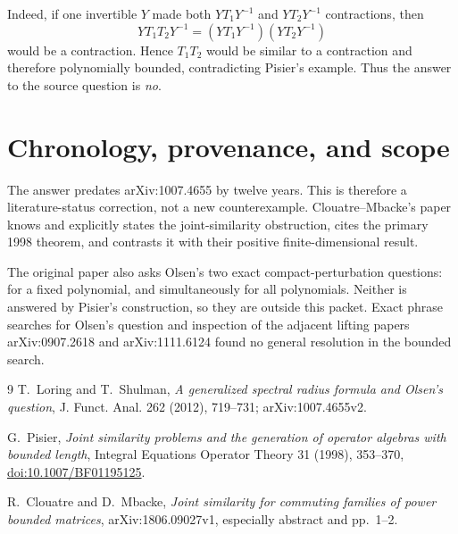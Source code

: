 \documentclass[10pt]{article}
\begin{document}
Indeed, if one invertible $Y$ made both $YT_1Y^{-1}$ and $YT_2Y^{-1}$
contractions, then
\[
 YT_1T_2Y^{-1}=(YT_1Y^{-1})(YT_2Y^{-1})
\]
would be a contraction.  Hence $T_1T_2$ would be similar to a contraction and
therefore polynomially bounded, contradicting Pisier's example.  Thus the
answer to the source question is \emph{no}.

\section*{Chronology, provenance, and scope}

The answer predates arXiv:1007.4655 by twelve years.  This is therefore a
literature-status correction, not a new counterexample.  Clouatre--Mbacke's
paper knows and explicitly states the joint-similarity obstruction, cites the
primary 1998 theorem, and contrasts it with their positive finite-dimensional
result.

The original paper also asks Olsen's two exact compact-perturbation questions:
for a fixed polynomial, and simultaneously for all polynomials.  Neither is
answered by Pisier's construction, so they are outside this packet.  Exact
phrase searches for Olsen's question and inspection of the adjacent lifting
papers arXiv:0907.2618 and arXiv:1111.6124 found no general resolution in the
bounded search.

{\small
\begin{thebibliography}{9}
T.~Loring and T.~Shulman,
\emph{A generalized spectral radius formula and Olsen's question},
J. Funct. Anal. 262 (2012), 719--731; arXiv:1007.4655v2.

G.~Pisier,
\emph{Joint similarity problems and the generation of operator algebras with
bounded length},
Integral Equations Operator Theory 31 (1998), 353--370,
\href{https://doi.org/10.1007/BF01195125}{doi:10.1007/BF01195125}.

R.~Clouatre and D.~Mbacke,
\emph{Joint similarity for commuting families of power bounded matrices},
arXiv:1806.09027v1, especially abstract and pp.~1--2.
\end{thebibliography}
}
\end{document}

